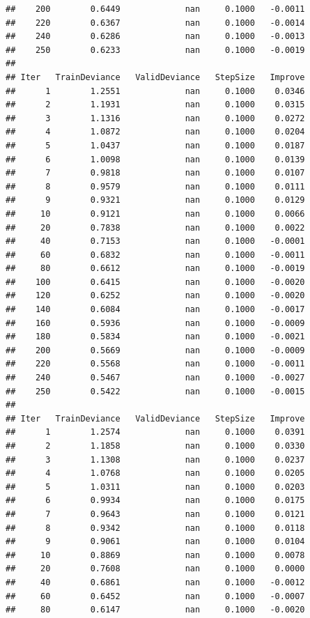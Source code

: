 \documentclass[]{book}
\begin{document}
\begin{verbatim}
##    200        0.6449             nan     0.1000   -0.0011
##    220        0.6367             nan     0.1000   -0.0014
##    240        0.6286             nan     0.1000   -0.0013
##    250        0.6233             nan     0.1000   -0.0019
## 
## Iter   TrainDeviance   ValidDeviance   StepSize   Improve
##      1        1.2551             nan     0.1000    0.0346
##      2        1.1931             nan     0.1000    0.0315
##      3        1.1316             nan     0.1000    0.0272
##      4        1.0872             nan     0.1000    0.0204
##      5        1.0437             nan     0.1000    0.0187
##      6        1.0098             nan     0.1000    0.0139
##      7        0.9818             nan     0.1000    0.0107
##      8        0.9579             nan     0.1000    0.0111
##      9        0.9321             nan     0.1000    0.0129
##     10        0.9121             nan     0.1000    0.0066
##     20        0.7838             nan     0.1000    0.0022
##     40        0.7153             nan     0.1000   -0.0001
##     60        0.6832             nan     0.1000   -0.0011
##     80        0.6612             nan     0.1000   -0.0019
##    100        0.6415             nan     0.1000   -0.0020
##    120        0.6252             nan     0.1000   -0.0020
##    140        0.6084             nan     0.1000   -0.0017
##    160        0.5936             nan     0.1000   -0.0009
##    180        0.5834             nan     0.1000   -0.0021
##    200        0.5669             nan     0.1000   -0.0009
##    220        0.5568             nan     0.1000   -0.0011
##    240        0.5467             nan     0.1000   -0.0027
##    250        0.5422             nan     0.1000   -0.0015
## 
## Iter   TrainDeviance   ValidDeviance   StepSize   Improve
##      1        1.2574             nan     0.1000    0.0391
##      2        1.1858             nan     0.1000    0.0330
##      3        1.1308             nan     0.1000    0.0237
##      4        1.0768             nan     0.1000    0.0205
##      5        1.0311             nan     0.1000    0.0203
##      6        0.9934             nan     0.1000    0.0175
##      7        0.9643             nan     0.1000    0.0121
##      8        0.9342             nan     0.1000    0.0118
##      9        0.9061             nan     0.1000    0.0104
##     10        0.8869             nan     0.1000    0.0078
##     20        0.7608             nan     0.1000    0.0000
##     40        0.6861             nan     0.1000   -0.0012
##     60        0.6452             nan     0.1000   -0.0007
##     80        0.6147             nan     0.1000   -0.0020

\end{verbatim}
\end{document}
